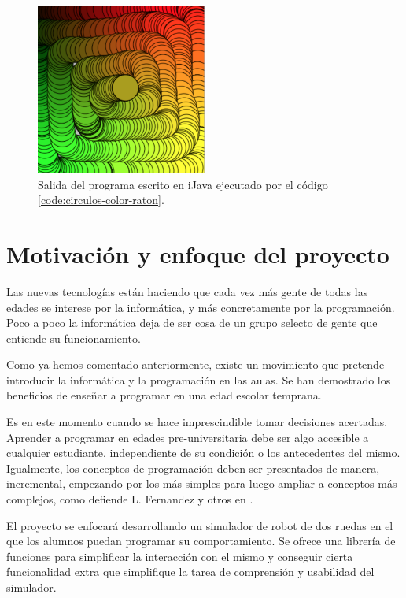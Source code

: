 \begin{figure}[!ht]
	\begin{centering}
		\includegraphics[width=0.5\textwidth]{images/salida-code-circulos-color-raton.png}
			\caption{Salida del programa escrito en iJava ejecutado por el código \ref{code:circulos-color-raton}.}
				\label{fig:salida-code-circulos-color-raton}
	\end{centering}
\end{figure}





\section{Motivación y enfoque del proyecto}
\label{sec:motivacion}

Las nuevas tecnologías están haciendo que cada vez más gente de todas las edades se interese por la informática, y más concretamente por la programación. Poco a poco la informática deja de ser cosa de un grupo selecto de gente que entiende su funcionamiento.

Como ya hemos comentado anteriormente, existe un movimiento que pretende introducir la informática y la programación en las aulas. Se han demostrado los beneficios de enseñar a programar en una edad escolar temprana.

Es en este momento cuando se hace imprescindible tomar decisiones acertadas. Aprender a programar en edades pre-universitaria debe ser algo accesible a cualquier estudiante, independiente de su condición o los antecedentes del mismo. Igualmente, los conceptos de programación deben ser presentados de manera, incremental, empezando por los más simples para luego ampliar a conceptos más complejos, como defiende L. Fernandez y otros en \cite{fernandez2002analisis}.

El proyecto se enfocará desarrollando un simulador de robot de dos ruedas en el que los alumnos puedan programar su comportamiento. Se ofrece una librería de funciones para simplificar la interacción con el mismo y conseguir cierta funcionalidad extra que simplifique la tarea de comprensión y usabilidad del simulador.

